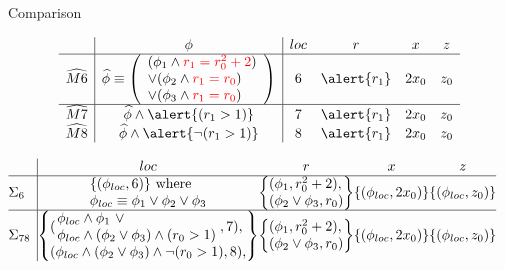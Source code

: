 \documentclass[xcolor={dvipsnames,table},16pt]{beamer}
\begin{document}
\begin{frame}[fragile]{Comparison}

{\footnotesize
$$
\begin{array}{l|c|cccc}
	             & \pc                                         & loc & r     & x    & z   \\ \hline
	\widehat{M6} & \widehat{\pc} \equiv 
	\left(\begin{array}{l}
		(\pc_1 \land \textcolor{red}{r_1 = r_0^2 + 2})     \\
		\lor(\pc_2 \land \textcolor{red}{r_1 = r_0}) \\
		\lor(\pc_3 \land \textcolor{red}{r_1 = r_0})
	\end{array}\right)                                         & 6   & \alert{r_1} & 2x_0 & z_0 \\\hline

	\widehat{M7} & \widehat{\pc} \land \alert{(r_1 > 1)}     & 7   & \alert{r_1} & 2x_0 & z_0 \\
	\widehat{M8} & \widehat{\pc} \land \alert{\neg(r_1 > 1)} & 8   & \alert{r_1} & 2x_0 & z_0
\end{array}
$$

$
\begin{array}{@{}l|@{}c@{}c@{}c@{}c@{}}
			&  loc          & r      & x    & z  \\ \hline
   \Sigma_6 &
		\begin{array}{@{}l@{}}
			\{(\pc_{loc}, 6)\} \text{ where } \\
			\pc_{loc} \equiv \pc_1 \lor \pc_2 \lor \pc_3\\
		\end{array}
		&
		\left\{
		\begin{array}{@{}l@{}}
			(\pc_1, r_0^2 + 2),\\
			(\pc_2 \lor \pc_3, r_0)
		\end{array} \right\}& \{(\pc_{loc}, 2x_0)\} & \{(\pc_{loc}, z_0)\} \\ \hline

\Sigma_{78} &
	\left\{
	\begin{array}{@{}l@{}}
		(\left.
		\begin{array}{@{}l@{}}
			\pc_{loc} \land \pc_1 \ \lor \\
			\pc_{loc} \land (\pc_2 \lor \pc_3) \land (r_0 > 1) \\
		\end{array}\right., 7), \\
		(\pc_{loc} \land(\pc_2 \lor \pc_3) \land \neg(r_0 > 1), 8), \\
	\end{array}
	\right\}
	&
	\left\{
	\begin{array}{@{}l@{}}
		(\pc_1, r_0^2 + 2),\\
		(\pc_2 \lor \pc_3, r_0)
	\end{array}\right\} & \{(\pc_{loc}, 2x_0)\} & \{(\pc_{loc}, z_0)\} \\
\end{array}
$}


\end{frame}
\end{document}
